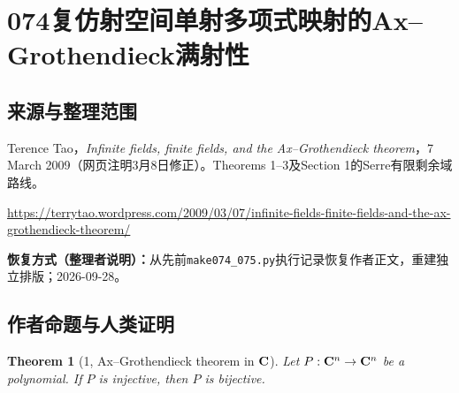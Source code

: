 \documentclass[UTF8,11pt]{ctexart}
\newtheorem*{theorem}{Theorem}
\theoremstyle{definition}
\begin{document}
\section*{074\quad 复仿射空间单射多项式映射的Ax--Grothendieck满射性}
\subsection*{来源与整理范围}
Terence Tao，\emph{Infinite fields, finite fields, and the Ax--Grothendieck theorem}，7 March 2009（网页注明3月8日修正）。Theorems 1--3及Section 1的Serre有限剩余域路线。
\par\url{https://terrytao.wordpress.com/2009/03/07/infinite-fields-finite-fields-and-the-ax-grothendieck-theorem/}
\par\textbf{恢复方式（整理者说明）：}从先前\nolinkurl{make074_075.py}执行记录恢复作者正文，重建独立排版；2026-09-28。
\subsection*{作者命题与人类证明}

\begin{theorem}[1, Ax--Grothendieck theorem in ${\bf C}$]
Let $P:{\bf C}^n\to{\bf C}^n$ be a polynomial. If $P$ is injective, then $P$ is bijective.
\end{theorem}
\end{document}
